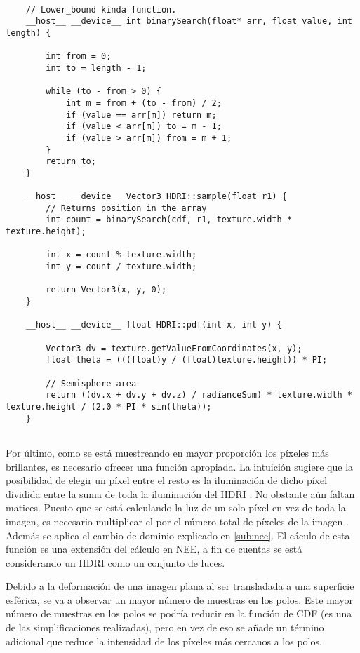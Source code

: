 \begin{lstlisting}
	
	// Lower_bound kinda function.
	__host__ __device__ int binarySearch(float* arr, float value, int length) {

		int from = 0;
		int to = length - 1;

		while (to - from > 0) {
			int m = from + (to - from) / 2;
			if (value == arr[m]) return m;
			if (value < arr[m])	to = m - 1;
			if (value > arr[m]) from = m + 1;
		}
		return to;
	}
	
	__host__ __device__ Vector3 HDRI::sample(float r1) {
		// Returns position in the array
		int count = binarySearch(cdf, r1, texture.width * texture.height);

		int x = count % texture.width;
		int y = count / texture.width;

		return Vector3(x, y, 0);
	}
	
	__host__ __device__ float HDRI::pdf(int x, int y) {

		Vector3 dv = texture.getValueFromCoordinates(x, y);
		float theta = (((float)y / (float)texture.height)) * PI;

		// Semisphere area
		return ((dv.x + dv.y + dv.z) / radianceSum) * texture.width * texture.height / (2.0 * PI * sin(theta));
	}
	
\end{lstlisting}

Por último, como se está muestreando en mayor proporción los píxeles más brillantes, es necesario ofrecer una función  apropiada. La intuición sugiere que la posibilidad de elegir un píxel entre el resto es la iluminación de dicho píxel dividida entre la suma de toda la iluminación del HDRI . No obstante aún faltan matices. Puesto que se está calculando la luz de un solo píxel en vez de toda la imagen, es necesario multiplicar el  por el número total de píxeles de la imagen . Además se aplica el cambio de dominio explicado en \autoref{sub:nee}. El cáculo de esta función  es una extensión del cálculo en NEE, a fin de cuentas se está considerando un HDRI como un conjunto de luces.

Debido a la deformación de una imagen plana al ser transladada a una superficie esférica, se va a observar un mayor número de muestras en los polos. Este mayor número de muestras en los polos se podría reducir en la función de CDF (es una de las simplificaciones realizadas), pero en vez de eso se añade un término adicional  que reduce la intensidad de los píxeles más cercanos a los polos.


